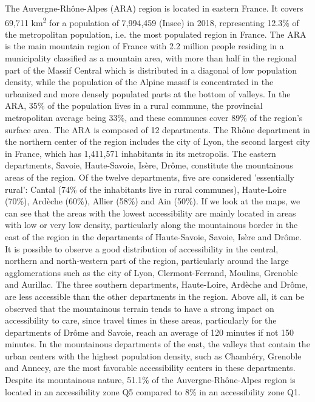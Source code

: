 The Auvergne-Rhône-Alpes (ARA) region is located in eastern France. It covers
69,711 km\textsuperscript{2} for a population of 7,994,459 (Insee) in 2018,
representing 12.3\% of the metropolitan population, i.e. the most populated
region in France. The ARA is the main mountain region of France with 2.2 million
people residing in a municipality classified as a mountain area, with more than
half in the regional part of the Massif Central which is distributed in a
diagonal of low population density, while the population of the Alpine massif is
concentrated in the urbanized and more densely populated parts at the bottom of
valleys. In the ARA, 35\% of the population lives in a rural commune, the
provincial metropolitan average being 33\%, and these communes cover 89\% of the
region's surface area. The ARA is composed of 12 departments. The Rhône
department in the northern center of the region includes the city of Lyon, the
second largest city in France, which has 1,411,571 inhabitants in its
metropolis. The eastern departments, Savoie, Haute-Savoie, Isère, Drôme,
constitute the mountainous areas of the region. Of the twelve departments, five
are considered 'essentially rural': Cantal (74\% of the inhabitants live in
rural communes), Haute-Loire (70\%), Ardèche (60\%), Allier (58\%) and Ain
(50\%). If we look at the maps, we can see that the areas with the lowest
accessibility are mainly located in areas with low or very low density,
particularly along the mountainous border in the east of the region in the
departments of Haute-Savoie, Savoie, Isère and Drôme. It is possible to observe
a good distribution of accessibility in the central, northern and north-western
part of the region, particularly around the large agglomerations such as the
city of Lyon, Clermont-Ferrand, Moulins, Grenoble and Aurillac. The three
southern departments, Haute-Loire, Ardèche and Drôme, are less accessible than
the other departments in the region. Above all, it can be observed that the
mountainous terrain tends to have a strong impact on accessibility to care,
since travel times in these areas, particularly for the departments of Drôme and
Savoie, reach an average of 120 minutes if not 150 minutes. In the mountainous
departments of the east, the valleys that contain the urban centers with the
highest population density, such as Chambéry, Grenoble and Annecy, are the most
favorable accessibility centers in these departments. Despite its mountainous
nature, 51.1\% of the Auvergne-Rhône-Alpes region is located in an accessibility
zone Q5 compared to 8\% in an accessibility zone Q1.

